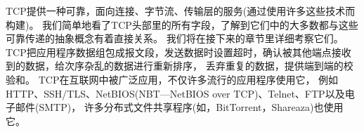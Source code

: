 \documentclass{../main.tex}{subfiles}
\begin{document}
TCP提供一种可靠，面向连接、字节流、传输层的服务(通过使用许多这些技术而构建)。
我们简单地看了TCP头部里的所有字段，了解到它们中的大多数都与这些可靠传递的抽象概念有着直接关系。
我们将在接下来的章节里详细考察它们。
TCP把应用程序数据组包成报文段，发送数据时设置超时，确认被其他端点接收到的数据，给次序杂乱的数据进行重新排序，
    丢弃重复的数据，提供端到端的校验和。
TCP在互联网中被广泛应用，不仅许多流行的应用程序使用它，
    例如HTTP、SSH/TLS、NetBIOS(NBT---NetBIOS over TCP)、Telnet、FTP以及电子邮件(SMTP)，
    许多分布式文件共享程序(如，BitTorrent，Shareaza)也使用它。

\end{document}
